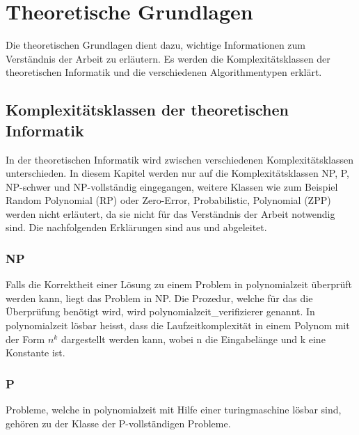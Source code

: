 %
%

\chapter{Theoretische Grundlagen}\label{chap.einleitung}
Die theoretischen Grundlagen dient dazu, wichtige Informationen zum Verständnis der Arbeit zu erläutern. Es werden die Komplexitätsklassen der theoretischen Informatik und die verschiedenen 
Algorithmentypen erklärt.

\section{Komplexitätsklassen der theoretischen Informatik}\label{cat_theo_inf}
In der theoretischen Informatik wird zwischen verschiedenen Komplexitätsklassen unterschieden. In diesem Kapitel werden nur auf die Komplexitätsklassen NP, P, NP-schwer und 
NP-vollständig eingegangen, weitere Klassen wie zum Beispiel Random Polynomial (RP) oder Zero-Error, Probabilistic, Polynomial (ZPP) werden nicht erläutert, da sie nicht für das Verständnis der 
Arbeit notwendig sind. Die nachfolgenden Erklärungen sind aus \cite{hopcroft2011einfuehrung} und \cite{slides_p_np} abgeleitet.

\subsection{NP}\label{np}
Falls die Korrektheit einer Lösung zu einem Problem in \gls{polynomialzeit} überprüft werden kann, liegt das Problem in NP. Die Prozedur, welche für das die Überprüfung benötigt wird, 
wird \gls{polynomialzeit_verifizierer} genannt.  In \gls{polynomialzeit} lösbar heisst, dass die Laufzeitkomplexität in einem Polynom mit der Form $n^k$ dargestellt werden kann, wobei n die 
Eingabelänge und k eine Konstante ist.

\subsection{P}\label{p_complet}
Probleme, welche in \gls{polynomialzeit} mit Hilfe einer  \gls{turingmaschine} lösbar sind, gehören zu der Klasse der P-vollständigen Probleme.

